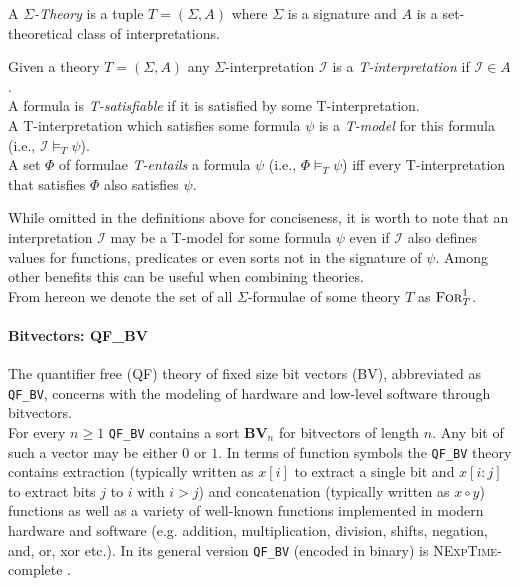 \begin{definition}
A \textit{$\Sigma$-Theory} is a tuple $T=\left(\Sigma,A\right)$ where $\Sigma$ is a signature and $A$ is a set-theoretical class of interpretations.
\end{definition}

\begin{definition}
Given a theory $T=\left(\Sigma,A\right)$ any $\Sigma$-interpretation $\mathcal{I}$ is a \textit{T-interpretation} if $\mathcal{I}\in A$.\\
A formula is \textit{T-satisfiable} if it is satisfied by some T-interpretation.\\
A T-interpretation which satisfies some formula $\psi$ is a \textit{T-model} for this formula (i.e., $\mathcal{I}\vDash_T\psi$).\\
A set $\Phi$ of formulae \textit{T-entails} a formula $\psi$ (i.e., $\Phi\vDash_T\psi$) iff every T-interpretation that satisfies $\Phi$ also satisfies $\psi$.
\end{definition}
While omitted in the definitions above for conciseness, it is worth to note that an interpretation $\mathcal{I}$ may be a T-model for some formula $\psi$ even if $\mathcal{I}$ also defines values for functions, predicates or even sorts not in the signature of $\psi$. Among other benefits this can be useful when combining theories.\\
From hereon we denote the set of all $\Sigma$-formulae of some theory $T$ as $\textsc{For}^1_T$.

\paragraph{Bitvectors: QF\_BV}
The quantifier free (QF) theory of fixed size bit vectors (BV), abbreviated as \texttt{QF\_BV}, concerns with the modeling of hardware and low-level software through bitvectors.\\
For every $n\geq1$ \texttt{QF\_BV} contains a sort $\mathbf{BV}_n$ for bitvectors of length $n$. Any bit of such a vector may be either $0$ or $1$.
In terms of function symbols the \texttt{QF\_BV} theory contains extraction (typically written as $x[i]$ to extract a single bit and $x[i\colon j]$ to extract bits $j$ to $i$ with $i>j$) and concatenation (typically written as $x\circ y$) functions as well as a variety of well-known functions implemented in modern hardware and software (e.g. addition, multiplication, division, shifts, negation, and, or, xor etc.). In its general version \texttt{QF\_BV} (encoded in binary) is \textsc{NExpTime}-complete \cite{KovasznaiFroehlichBiere-SMT12}.


